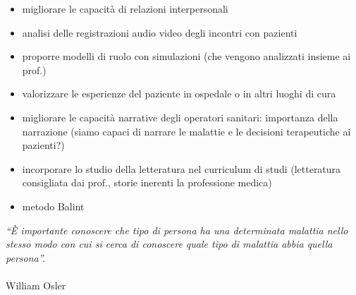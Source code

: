 \begin{itemize}
\item
  migliorare le capacità di relazioni interpersonali
\item
  analisi delle registrazioni audio video degli incontri con pazienti
\item
  proporre modelli di ruolo con simulazioni (che vengono analizzati
  insieme ai prof.)
\item
  valorizzare le esperienze del paziente in ospedale o in altri luoghi
  di cura
\item
  migliorare le capacità narrative degli operatori sanitari: importanza
  della narrazione (siamo capaci di narrare le malattie e le decisioni
  terapeutiche ai pazienti?)
\item
  incorporare lo studio della letteratura nel curriculum di studi
  (letteratura consigliata dai prof., storie inerenti la professione
  medica)
\item
  metodo Balint
\end{itemize}

\emph{``È importante conoscere che tipo di persona ha una determinata
malattia nello stesso modo con cui si cerca di conoscere quale tipo di
malattia abbia quella persona''.}
\\\\
William Osler
